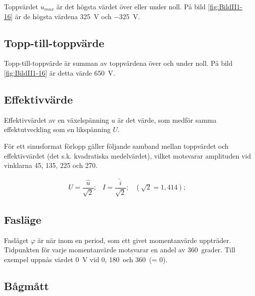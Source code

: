 Toppvärdet \(u_{max}\) är det högsta värdet över eller under noll.
På bild \ref{fig:BildII1-16} är de högsta värdena \SI{+325}{V} och \SI{-325}{V}.

\subsection{Topp-till-toppvärde}

Topp-till-toppvärde är summan av toppvärdena över och under noll.
På bild \ref{fig:BildII1-16} är detta värde \SI{650}{V}.

\subsection{Effektivvärde}

Effektivvärdet av en växelspänning \(u\) är det värde, som medför samma
effektutveckling som en likspänning \(U\).

För ett sinusformat förlopp gäller följande samband mellan toppvärdet
och effektivvärdet (det s.k. kvadratiska medelvärdet), vilket
motsvarar amplituden vid vinklarna 45, 135, 225 och 270\degree.

\begin{equation*}
  \begin{array}{lllll}
    U=\dfrac{\hat{u}}{\sqrt{2}}; & I=\dfrac{\hat{i}}{\sqrt{2}}; & (\sqrt{2} = 1,414);
  \end{array}
\end{equation*}

\subsection{Fasläge}

Fasläget \(\varphi\) är när inom en period, som ett givet momentanvärde
uppträder. Tidpunkten för varje momentanvärde motsvarar en andel av 360\degree\ grader.
Till exempel uppnås värdet \SI{0}{V} vid 0\degree, 180\degree~och
360\degree~(= 0\degree).

\subsection{Bågmått}

